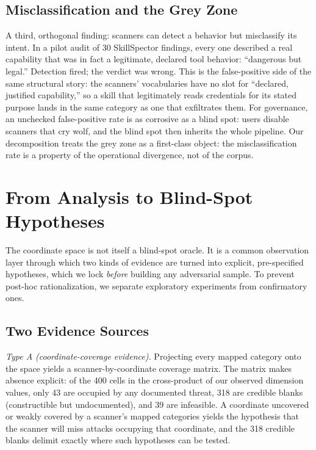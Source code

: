 \documentclass[sigconf,nonacm]{acmart}
\begin{document}
\subsection{Misclassification and the Grey Zone}
A third, orthogonal finding: scanners can detect a behavior but misclassify its intent. In a pilot audit of 30 SkillSpector findings, every one described a real capability that was in fact a legitimate, declared tool behavior: ``dangerous but legal.'' Detection fired; the verdict was wrong. This is the false-positive side of the same structural story: the scanners' vocabularies have no slot for ``declared, justified capability,'' so a skill that legitimately reads credentials for its stated purpose lands in the same category as one that exfiltrates them. For governance, an unchecked false-positive rate is as corrosive as a blind spot: users disable scanners that cry wolf, and the blind spot then inherits the whole pipeline. Our decomposition treats the grey zone as a first-class object: the misclassification rate is a property of the operational divergence, not of the corpus.

\section{From Analysis to Blind-Spot Hypotheses}
\label{sec:hypotheses}

The coordinate space is not itself a blind-spot oracle. It is a common observation layer through which two kinds of evidence are turned into explicit, pre-specified hypotheses, which we lock \emph{before} building any adversarial sample. To prevent post-hoc rationalization, we separate exploratory experiments from confirmatory ones.

\subsection{Two Evidence Sources}
\emph{Type A (coordinate-coverage evidence).} Projecting every mapped category onto the space yields a scanner-by-coordinate coverage matrix. The matrix makes absence explicit: of the 400 cells in the cross-product of our observed dimension values, only 43 are occupied by any documented threat, 318 are credible blanks (constructible but undocumented), and 39 are infeasible. A coordinate uncovered or weakly covered by a scanner's mapped categories yields the hypothesis that the scanner will miss attacks occupying that coordinate, and the 318 credible blanks delimit exactly where such hypotheses can be tested.
\end{document}
